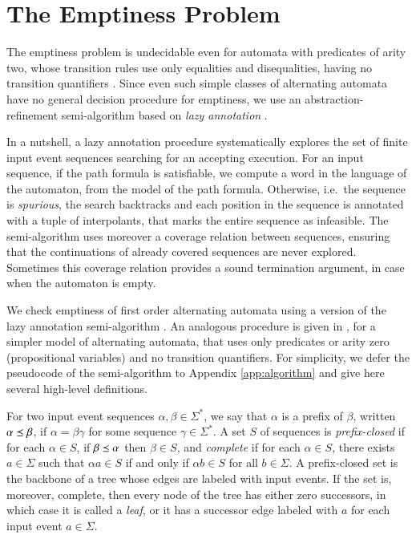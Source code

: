\section{The Emptiness Problem}
\label{sec:emptiness}

The emptiness problem is undecidable even for automata with predicates
of arity two, whose transition rules use only equalities and
disequalities, having no transition quantifiers \cite{Farzan15}. Since
even such simple classes of alternating automata have no general
decision procedure for emptiness, we use an abstraction-refinement
semi-algorithm based on \emph{lazy annotation}
\cite{McMillan06,McMillan14}.

In a nutshell, a lazy annotation procedure systematically explores the
set of finite input event sequences searching for an accepting
execution. For an input sequence, if the path formula is satisfiable,
we compute a word in the language of the automaton, from the model of
the path formula. Otherwise, i.e.\ the sequence is \emph{spurious},
the search backtracks and each position in the sequence is annotated
with a tuple of interpolants, that marks the entire sequence as
infeasible. The semi-algorithm uses moreover a coverage relation
between sequences, ensuring that the continuations of already covered
sequences are never explored. Sometimes this coverage relation
provides a sound termination argument, in case when the automaton is
empty.

We check emptiness of first order alternating automata using a version
of the \impact~ lazy annotation semi-algorithm \cite{McMillan06}. An
analogous procedure is given in \cite{IosifXu18}, for a simpler model
of alternating automata, that uses only predicates or arity zero
(propositional variables) and no transition quantifiers. For
simplicity, we defer the pseudocode of the semi-algorithm to Appendix
\ref{app:algorithm} and give here several high-level definitions.

For two input event sequences $\alpha, \beta \in \Sigma^*$, we say
that $\alpha$ is a prefix of $\beta$, written $\alpha \preceq \beta$,
if $\alpha=\beta\gamma$ for some sequence $\gamma\in\Sigma^*$. A set
$S$ of sequences is \emph{prefix-closed} if for each $\alpha \in S$,
if $\beta \preceq \alpha$ then $\beta \in S$, and \emph{complete} if
for each $\alpha \in S$, there exists $a \in \Sigma$ such that $\alpha
a \in S$ if and only if $\alpha b \in S$ for all $b \in \Sigma$. A
prefix-closed set is the backbone of a tree whose edges are labeled
with input events. If the set is, moreover, complete, then every node
of the tree has either zero successors, in which case it is called a
\emph{leaf}, or it has a successor edge labeled with $a$ for each
input event $a \in \Sigma$.


